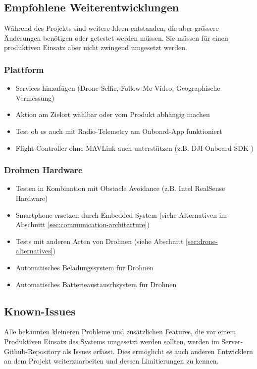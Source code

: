 \newpage

\subsection{Empfohlene Weiterentwicklungen}

Während des Projekts sind weitere Ideen entstanden, die aber grössere Änderungen benötigen oder getestet werden müssen. Sie müssen für einen produktiven Einsatz aber nicht zwingend umgesetzt werden.

\subsubsection{Plattform}

\begin{itemize}
	\item Services hinzufügen (Drone-Selfie, Follow-Me Video, Geographische Vermessung)
	\item Aktion am Zielort wählbar oder vom Produkt abhängig machen
	\item Test ob es auch mit Radio-Telemetry am Onboard-App funktioniert
	\item Flight-Controller ohne MAVLink auch unterstützen (z.B. DJI-Onboard-SDK \cite{dji-sdk})
\end{itemize}

\subsubsection{Drohnen Hardware} 
\begin{itemize}
	\item Testen in Kombination mit Obstacle Avoidance (z.B. Intel RealSense\cite{realsense} Hardware)
	\item Smartphone ersetzen durch Embedded-System (siehe Alternativen im Abschnitt \ref{sec:communication-architecture}) 
	\item Tests mit anderen Arten von Drohnen (siehe Abschnitt \ref{sec:drone-alternatives})
	\item Automatisches Beladungssystem für Drohnen
	\item Automatisches Batterieaustauschsystem für Drohnen
\end{itemize} 


\subsection{Known-Issues}

Alle bekannten kleineren Probleme und zusätzlichen Features, die vor einem Produktiven Einsatz des Systems umgesetzt werden sollten, werden im Server-Github-Repository als Issues erfasst. Dies ermöglicht es auch anderen Entwicklern an dem Projekt weiterzuarbeiten und dessen Limitierungen zu kennen.


